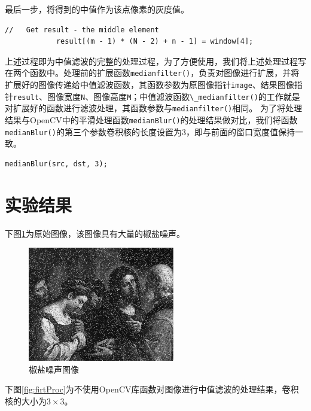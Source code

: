 \documentclass[a4paper]{ctexrep}
\begin{document}
最后一步，将得到的中值作为该点像素的灰度值。

\begin{lstlisting}
//   Get result - the middle element
			result[(m - 1) * (N - 2) + n - 1] = window[4];
\end{lstlisting}

上述过程即为中值滤波的完整的处理过程，为了方便使用，我们将上述处理过程写在两个函数中。处理前的扩展函数\lstinline{medianfilter()}，负责对图像进行扩展，并将扩展好的图像传递给中值滤波函数，其函数参数为原图像指针\lstinline{image}、结果图像指针\lstinline{result}、图像宽度\lstinline{N}、图像高度\lstinline{M}；中值滤波函数\lstinline{\_medianfilter()}的工作就是对扩展好的函数进行滤波处理，其函数参数与\lstinline{medianfilter()}相同。
为了将处理结果与OpenCV中的平滑处理函数\lstinline{medianBlur()}的处理结果做对比，我们将函数\lstinline{medianBlur()}的第三个参数卷积核的长度设置为3，即与前面的窗口宽度值保持一致。

\begin{lstlisting}
medianBlur(src, dst, 3);
\end{lstlisting}

\section{实验结果}

下图\ref {fig:previous}为原始图像，该图像具有大量的椒盐噪声。

\begin{figure}[h]
\centering
\includegraphics[height=5cm]{img/impulseNoise.pdf}
\caption{椒盐噪声图像}
\label {fig:previous}
\end{figure}

下图\ref {fig:firtProc}为不使用OpenCV库函数对图像进行中值滤波的处理结果，卷积核的大小为$3\times3$。
\end{document}
